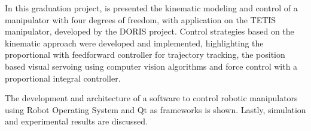 \begin{foreignabstract}

In this graduation project, is presented the kinematic modeling and control of a manipulator with four degrees of freedom, with application on the TETIS manipulator, developed by the DORIS project. Control strategies based on the kinematic approach were developed and implemented, highlighting the proportional with feedforward controller for trajectory tracking, the position based visual servoing using computer vision algorithms and force control with a proportional integral controller.

The development and architecture of a software to control robotic manipulators using Robot Operating System and Qt as frameworks is shown. Lastly, simulation and experimental results are discussed.


\end{foreignabstract}